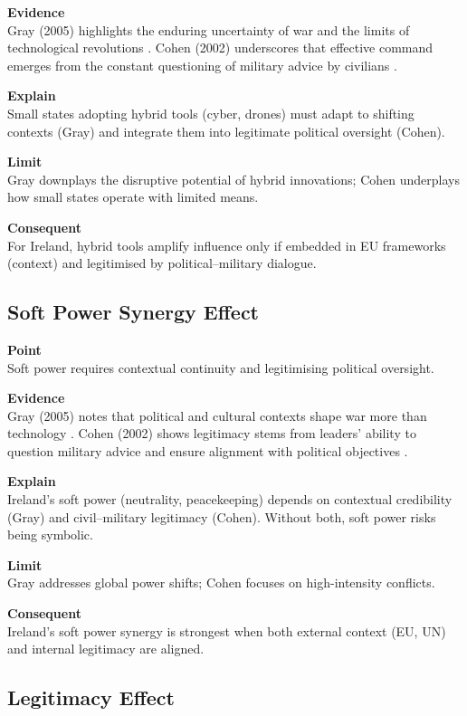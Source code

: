 \textbf{Evidence} \\
Gray (2005) highlights the enduring uncertainty of war and the limits of technological revolutions \parencite{GRAY_2005}.  
Cohen (2002) underscores that effective command emerges from the constant questioning of military advice by civilians \parencite{COHEN_2002}.  

\textbf{Explain} \\
Small states adopting hybrid tools (cyber, drones) must adapt to shifting contexts (Gray) and integrate them into legitimate political oversight (Cohen).

\textbf{Limit} \\
Gray downplays the disruptive potential of hybrid innovations; Cohen underplays how small states operate with limited means.

\textbf{Consequent} \\
For Ireland, hybrid tools amplify influence only if embedded in EU frameworks (context) and legitimised by political--military dialogue.  

\subsection*{Soft Power Synergy Effect}

\textbf{Point} \\
Soft power requires contextual continuity and legitimising political oversight.

\textbf{Evidence} \\
Gray (2005) notes that political and cultural contexts shape war more than technology \parencite{GRAY_2005}.  
Cohen (2002) shows legitimacy stems from leaders’ ability to question military advice and ensure alignment with political objectives \parencite{COHEN_2002}.  

\textbf{Explain} \\
Ireland’s soft power (neutrality, peacekeeping) depends on contextual credibility (Gray) and civil--military legitimacy (Cohen). Without both, soft power risks being symbolic.

\textbf{Limit} \\
Gray addresses global power shifts; Cohen focuses on high-intensity conflicts.

\textbf{Consequent} \\
Ireland’s soft power synergy is strongest when both external context (EU, UN) and internal legitimacy are aligned.  

\subsection*{Legitimacy Effect}

